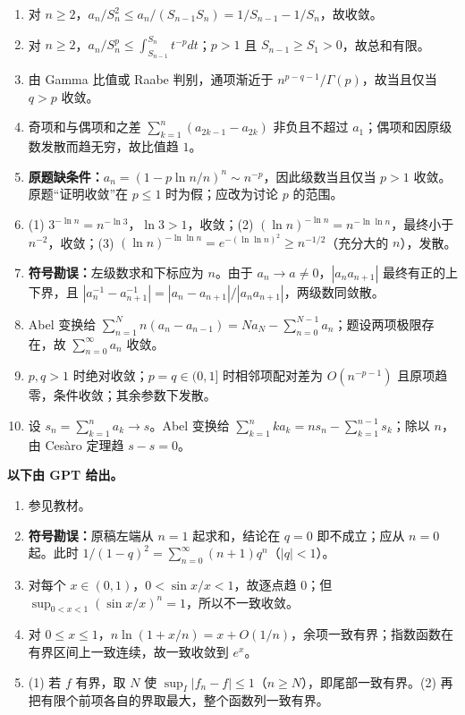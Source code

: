 \begin{enumerate}
\item 对 $n\ge2$，$a_n/S_n^2\le a_n/(S_{n-1}S_n)=1/S_{n-1}-1/S_n$，故收敛。
\item 对 $n\ge2$，$a_n/S_n^p\le\int_{S_{n-1}}^{S_n}t^{-p}dt$；$p>1$ 且 $S_{n-1}\ge S_1>0$，故总和有限。
\item 由 Gamma 比值或 Raabe 判别，通项渐近于 $n^{p-q-1}/\Gamma(p)$，故当且仅当 $q>p$ 收敛。
\item 奇项和与偶项和之差 $\sum_{k=1}^n(a_{2k-1}-a_{2k})$ 非负且不超过 $a_1$；偶项和因原级数发散而趋无穷，故比值趋 $1$。
\item \textbf{原题缺条件：}$a_n=(1-p\ln n/n)^n\sim n^{-p}$，因此级数当且仅当 $p>1$ 收敛。原题“证明收敛”在 $p\le1$ 时为假；应改为讨论 $p$ 的范围。
\item (1) $3^{-\ln n}=n^{-\ln3}$，$\ln3>1$，收敛；(2) $(\ln n)^{-\ln n}=n^{-\ln\ln n}$，最终小于 $n^{-2}$，收敛；(3) $(\ln n)^{-\ln\ln n}=e^{-(\ln\ln n)^2}\ge n^{-1/2}$（充分大的 $n$），发散。
\item \textbf{符号勘误：}左级数求和下标应为 $n$。由于 $a_n\to a\ne0$，$|a_na_{n+1}|$ 最终有正的上下界，且 $|a_n^{-1}-a_{n+1}^{-1}|=|a_n-a_{n+1}|/|a_na_{n+1}|$，两级数同敛散。
\item Abel 变换给 $\sum_{n=1}^Nn(a_n-a_{n-1})=Na_N-\sum_{n=0}^{N-1}a_n$；题设两项极限存在，故 $\sum_{n=0}^\infty a_n$ 收敛。
\item $p,q>1$ 时绝对收敛；$p=q\in(0,1]$ 时相邻项配对差为 $O(n^{-p-1})$ 且原项趋零，条件收敛；其余参数下发散。
\item 设 $s_n=\sum_{k=1}^na_k\to s$。Abel 变换给 $\sum_{k=1}^nka_k=ns_n-\sum_{k=1}^{n-1}s_k$；除以 $n$，由 Ces\`aro 定理趋 $s-s=0$。
\end{enumerate}
\noindent\textbf{以下由 GPT 给出。}
\begin{enumerate}
\item 参见教材。
\item \textbf{符号勘误：}原稿左端从 $n=1$ 起求和，结论在 $q=0$ 即不成立；应从 $n=0$ 起。此时 $1/(1-q)^2=\sum_{n=0}^\infty(n+1)q^n$（$|q|<1$）。
\item 对每个 $x\in(0,1)$，$0<\sin x/x<1$，故逐点趋 $0$；但 $\sup_{0<x<1}(\sin x/x)^n=1$，所以不一致收敛。
\item 对 $0\le x\le1$，$n\ln(1+x/n)=x+O(1/n)$，余项一致有界；指数函数在有界区间上一致连续，故一致收敛到 $e^x$。
\item (1) 若 $f$ 有界，取 $N$ 使 $\sup_I|f_n-f|\le1$（$n\ge N$），即尾部一致有界。(2) 再把有限个前项各自的界取最大，整个函数列一致有界。
\end{enumerate}

